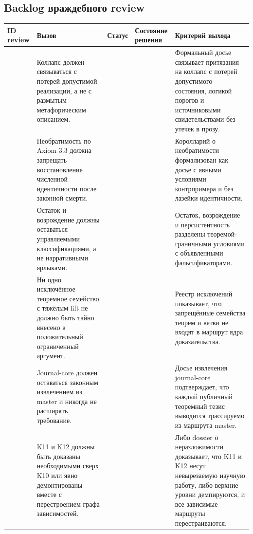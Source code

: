 \subsection{Backlog враждебного review}
\begin{center}
\begin{tabular}{@{}L{0.18\textwidth}L{0.25\textwidth}L{0.11\textwidth}L{0.15\textwidth}L{0.23\textwidth}@{}}
\toprule
ID review & Вызов & Статус & Состояние решения & Критерий выхода \\
\midrule
{} & Коллапс должен связываться с потерей допустимой реализации, а не с размытым метафорическим описанием. &  &  & Формальный досье связывает притязания на коллапс с потерей допустимого состояния, логикой порогов и источниковыми свидетельствами без утечек в прозу. \\
 & Необратимость по Axiom 3.3 должна запрещать восстановление численной идентичности после законной смерти. &  &  & Королларий о необратимости формализован как досье с явными условиями контрпримера и без лазейки идентичности. \\
 & Остаток и возрождение должны оставаться управляемыми классификациями, а не нарративными ярлыками. &  &  & Остаток, возрождение и персистентность разделены теоремой-граничными условиями с объявленными фальсификаторами. \\
 & Ни одно исключённое теоремное семейство с тяжёлым lift не должно быть тайно внесено в положительный ограниченный аргумент. &  &  & Реестр исключений показывает, что запрещённые семейства теорем и ветви не входят в маршрут ядра доказательства. \\
 & Journal-core должен оставаться законным извлечением из master и никогда не расширять требование. &  &  & Досье извлечения journal-core подтверждает, что каждый публичный теоремный тезис выводится трассируемо из маршрута master. \\
 & K11 и K12 должны быть доказаны необходимыми сверх K10 или явно демонтированы вместе с перестроением графа зависимостей. &  &  & Либо dossier о неразложимости доказывает, что K11 и K12 несут невырезаемую научную работу, либо верхние уровни демпируются, и все зависимые маршруты перестраиваются. \\
\bottomrule
\end{tabular}
\end{center}

